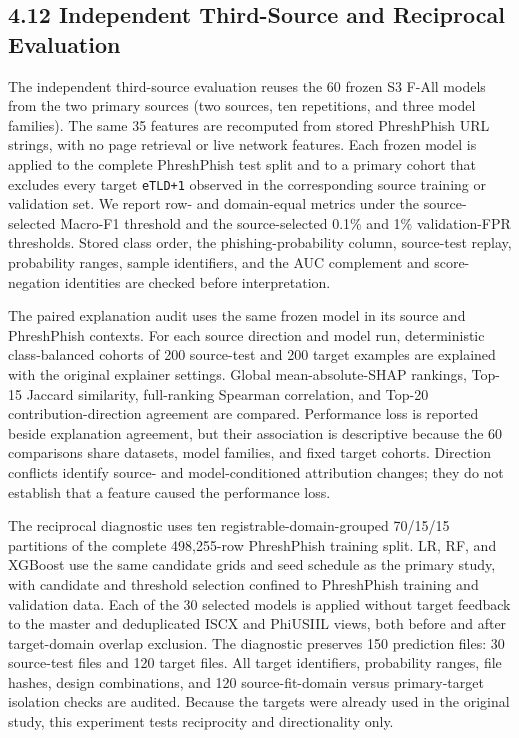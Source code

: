\documentclass[
  10pt,
]{article}
\begin{document}
\subsection{4.12 Independent Third-Source and Reciprocal
Evaluation}\label{independent-third-source-and-reciprocal-evaluation}

The independent third-source evaluation reuses the 60 frozen S3 F-All
models from the two primary sources (two sources, ten repetitions, and
three model families). The same 35 features are recomputed from stored
PhreshPhish URL strings, with no page retrieval or live network
features. Each frozen model is applied to the complete PhreshPhish test
split and to a primary cohort that excludes every target \texttt{eTLD+1}
observed in the corresponding source training or validation set. We
report row- and domain-equal metrics under the source-selected Macro-F1
threshold and the source-selected 0.1\% and 1\% validation-FPR
thresholds. Stored class order, the phishing-probability column,
source-test replay, probability ranges, sample identifiers, and the AUC
complement and score-negation identities are checked before
interpretation.

The paired explanation audit uses the same frozen model in its source
and PhreshPhish contexts. For each source direction and model run,
deterministic class-balanced cohorts of 200 source-test and 200 target
examples are explained with the original explainer settings. Global
mean-absolute-SHAP rankings, Top-15 Jaccard similarity, full-ranking
Spearman correlation, and Top-20 contribution-direction agreement are
compared. Performance loss is reported beside explanation agreement, but
their association is descriptive because the 60 comparisons share
datasets, model families, and fixed target cohorts. Direction conflicts
identify source- and model-conditioned attribution changes; they do not
establish that a feature caused the performance loss.

The reciprocal diagnostic uses ten registrable-domain-grouped 70/15/15
partitions of the complete 498,255-row PhreshPhish training split. LR,
RF, and XGBoost use the same candidate grids and seed schedule as the
primary study, with candidate and threshold selection confined to
PhreshPhish training and validation data. Each of the 30 selected models
is applied without target feedback to the master and deduplicated ISCX
and PhiUSIIL views, both before and after target-domain overlap
exclusion. The diagnostic preserves 150 prediction files: 30 source-test
files and 120 target files. All target identifiers, probability ranges,
file hashes, design combinations, and 120 source-fit-domain versus
primary-target isolation checks are audited. Because the targets were
already used in the original study, this experiment tests reciprocity
and directionality only.
\end{document}
